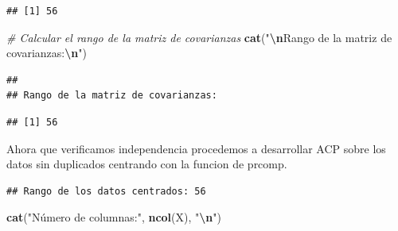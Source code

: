 \documentclass[
]{article}
\newenvironment{Shaded}{\begin{snugshade}}{\end{snugshade}}
\newcommand{\AttributeTok}[1]{\textcolor[rgb]{0.13,0.29,0.53}{#1}}
\newcommand{\CommentTok}[1]{\textcolor[rgb]{0.56,0.35,0.01}{\textit{#1}}}
\newcommand{\FloatTok}[1]{\textcolor[rgb]{0.00,0.00,0.81}{#1}}
\newcommand{\FunctionTok}[1]{\textcolor[rgb]{0.13,0.29,0.53}{\textbf{#1}}}
\newcommand{\NormalTok}[1]{#1}
\newcommand{\OtherTok}[1]{\textcolor[rgb]{0.56,0.35,0.01}{#1}}
\newcommand{\SpecialCharTok}[1]{\textcolor[rgb]{0.81,0.36,0.00}{\textbf{#1}}}
\newcommand{\StringTok}[1]{\textcolor[rgb]{0.31,0.60,0.02}{#1}}
\begin{document}
\begin{verbatim}
## [1] 56
\end{verbatim}

\begin{Shaded}
\begin{Highlighting}[]
\CommentTok{\# Calcular el rango de la matriz de covarianzas}
\FunctionTok{cat}\NormalTok{(}\StringTok{"}\SpecialCharTok{\textbackslash{}n}\StringTok{Rango de la matriz de covarianzas:}\SpecialCharTok{\textbackslash{}n}\StringTok{"}\NormalTok{)}
\end{Highlighting}
\end{Shaded}

\begin{verbatim}
## 
## Rango de la matriz de covarianzas:
\end{verbatim}

\begin{Shaded}
\end{Shaded}

\begin{verbatim}
## [1] 56
\end{verbatim}

Ahora que verificamos independencia procedemos a desarrollar ACP sobre
los datos sin duplicados centrando con la funcion de prcomp.

\begin{Shaded}
\end{Shaded}

\begin{verbatim}
## Rango de los datos centrados: 56
\end{verbatim}

\begin{Shaded}
\begin{Highlighting}[]
\FunctionTok{cat}\NormalTok{(}\StringTok{"Número de columnas:"}\NormalTok{, }\FunctionTok{ncol}\NormalTok{(X), }\StringTok{"}\SpecialCharTok{\textbackslash{}n}\StringTok{"}\NormalTok{)}
\end{Highlighting}
\end{Shaded}
\end{document}
